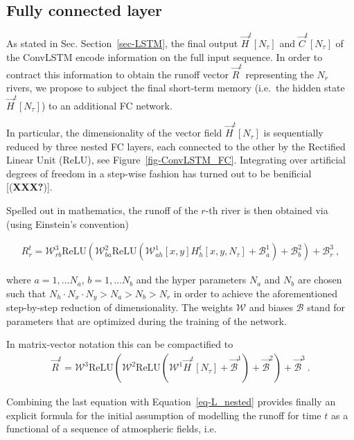 \documentclass[
]{agujournal2019}
\begin{document}
\subsection{Fully connected layer}\label{sec-FC_layer}

As stated in Sec. Section~\ref{sec-LSTM}, the final output
\(\vec{H}^t[N_\tau]\) and \(\vec{C}^t[N_\tau]\) of the ConvLSTM encode
information on the full input sequence. In order to contract this
information to obtain the runoff vector \(\vec{R}^t\) representing the
\(N_r\) rivers, we propose to subject the final short-term memory
(i.e.~the hidden state \(\vec{H}^t[N_\tau]\)) to an additional FC
network.

In particular, the dimensionality of the vector field
\(\vec{H}^t[N_\tau]\) is sequentially reduced by three nested FC layers,
each connected to the other by the Rectified Linear Unit (ReLU), see
Figure~\ref{fig-ConvLSTM_FC}. Integrating over artificial degrees of
freedom in a step-wise fashion has turned out to be benificial
{[}(\textbf{XXX?}){]}.

Spelled out in mathematics, the runoff of the \(r\)-th river is then
obtained via (using Einstein's convention)

\[
\begin{aligned}
R_r^t = \mathcal{W}^{3}_{rb}\mathrm{ReLU}\left(\mathcal{W}^{2}_{ba}\mathrm{ReLU}\left(\mathcal{W}^{1}_{ah} [x,y] H^t_h[x,y, N_\tau] + \mathcal{B}^1_a\right) + \mathcal{B}^2_b \right) + \mathcal{B}^3_r \ ,
\end{aligned}
\]

where \(a=1,\ldots N_a\), \(b=1,\ldots N_b\) and the hyper parameters
\(N_a\) and \(N_b\) are chosen such that
\(N_h\cdot N_x\cdot N_y > N_a > N_b > N_r\) in order to achieve the
aforementioned step-by-step reduction of dimensionality. The weights
\(\mathcal{W}\) and biases \(\mathcal{B}\) stand for parameters that are
optimized during the training of the network.

In matrix-vector notation this can be compactified to \[
\begin{aligned}
\vec{R}^t = \pmb{\mathcal{W}}^{3}\mathrm{ReLU}\left(\pmb{\mathcal{W}}^{2}\mathrm{ReLU}\left(\pmb{\mathcal{W}}^{1} \vec{H}^t[N_\tau] + \vec{\mathcal{B}}^1\right) + \vec{\mathcal{B}}^2 \right) + \vec{\mathcal{B}}^3 \ .
\end{aligned}
\]

Combining the last equation with Equation~\ref{eq-L_nested} provides
finally an explicit formula for the initial assumption of modelling the
runoff for time \(t\) as a functional of a sequence of atmospheric
fields, i.e.
\end{document}
